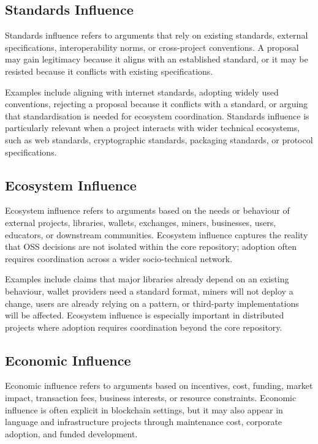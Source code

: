 \documentclass[sigconf,screen]{acmart}
\begin{document}
\subsection{Standards Influence}

Standards influence refers to arguments that rely on existing standards, external specifications, interoperability norms, or cross-project conventions. A proposal may gain legitimacy because it aligns with an established standard, or it may be resisted because it conflicts with existing specifications.

Examples include aligning with internet standards, adopting widely used conventions, rejecting a proposal because it conflicts with a standard, or arguing that standardisation is needed for ecosystem coordination. Standards influence is particularly relevant when a project interacts with wider technical ecosystems, such as web standards, cryptographic standards, packaging standards, or protocol specifications.

\subsection{Ecosystem Influence}

Ecosystem influence refers to arguments based on the needs or behaviour of external projects, libraries, wallets, exchanges, miners, businesses, users, educators, or downstream communities. Ecosystem influence captures the reality that OSS decisions are not isolated within the core repository; adoption often requires coordination across a wider socio-technical network.

Examples include claims that major libraries already depend on an existing behaviour, wallet providers need a standard format, miners will not deploy a change, users are already relying on a pattern, or third-party implementations will be affected. Ecosystem influence is especially important in distributed projects where adoption requires coordination beyond the core repository.

\subsection{Economic Influence}

Economic influence refers to arguments based on incentives, cost, funding, market impact, transaction fees, business interests, or resource constraints. Economic influence is often explicit in blockchain settings, but it may also appear in language and infrastructure projects through maintenance cost, corporate adoption, and funded development.
\end{document}
